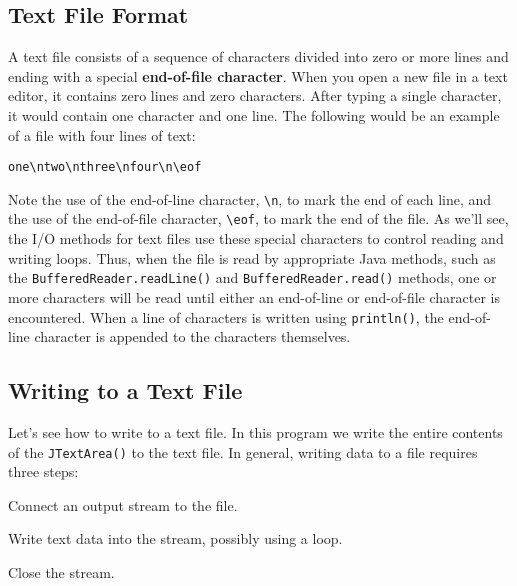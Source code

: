\subsection{Text File Format}
\noindent A text file consists of a sequence of characters divided into zero or
more lines and ending with a special {\bf end-of-file character}.
When you open a new file in a text editor, it contains zero lines and
zero characters.  After typing a single character, it would contain one
character and one line.  The following would be an example of a file with
four lines of text:

\begin{jjjlisting}
\begin{lstlisting}
one\ntwo\nthree\nfour\n\eof
\end{lstlisting}
\end{jjjlisting}


\noindent Note the use of the end-of-line character,
 \verb|\n|, to mark the
end of each line, and the use of the end-of-file character,
 \verb|\eof|,
to mark the end of the file.   As we'll see, the I/O methods for
text files use these special characters to control reading and writing
loops.  Thus, when the file is read by appropriate Java methods, such
as the {\tt BufferedReader.readLine()} and {\tt Buffered\-Reader.read()}
methods, one or more characters will be read until either an
end-of-line or end-of-file character is encountered.   When a line of
characters is written using {\tt println()}, the end-of-line character
is appended to the characters themselves.

\subsection{Writing to a Text File}
\noindent Let's see how to write to a text file.  In this program we write the
entire contents of the {\tt JTextArea()} to the text file.  In general,
writing data to a file requires three steps:


\begin{NL}
\item  Connect an output stream to the file.
\item  Write text data into the stream, possibly using a loop.
\item  Close the stream.
\end{NL}

